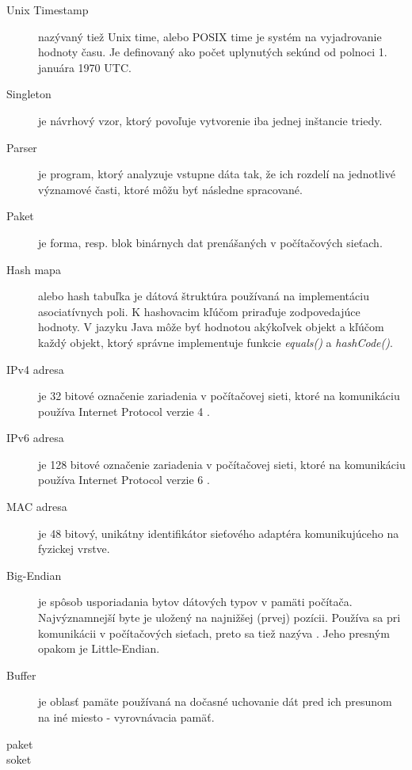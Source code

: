 \documentclass[]{tukediphc}
\begin{document}
\begin{description}
	
	\item[Unix Timestamp] nazývaný tiež Unix time, alebo POSIX time je systém na vyjadrovanie 
	hodnoty času. Je definovaný ako počet uplynutých sekúnd od polnoci 1. januára 1970 UTC.
	
	\item[Singleton] je návrhový vzor, ktorý povoľuje vytvorenie iba jednej inštancie triedy. 
	
	\item[Parser] je program, ktorý analyzuje vstupne dáta tak, že ich rozdelí na jednotlivé 
	významové časti, ktoré môžu byť následne spracované. \citep{veri}
	
	\item[Paket] je forma, resp. blok binárnych dat prenášaných v počítačových sieťach.
	
	\item[Hash mapa] alebo hash tabuľka je dátová štruktúra používaná na implementáciu asociatívnych 
	poli. K hashovacim kľúčom priraďuje zodpovedajúce hodnoty. V jazyku Java môže byť hodnotou 
	akýkoľvek objekt a kľúčom každý objekt, ktorý správne implementuje funkcie \emph{equals()} a 
	\emph{hashCode()}.
	
	\item[IPv4 adresa] je 32 bitové označenie zariadenia v počítačovej sieti, ktoré na komunikáciu 
	používa Internet Protocol verzie 4 \citep{rfc791}.
	
	\item[IPv6 adresa] je 128 bitové označenie zariadenia v počítačovej sieti, ktoré na komunikáciu 
	používa Internet Protocol verzie 6 \citep{rfc2460}.
	
	\item[MAC adresa] je 48 bitový, unikátny identifikátor sieťového adaptéra komunikujúceho na 
	fyzickej vrstve. 
	
	\item[Big-Endian] je spôsob usporiadania bytov dátových typov v pamäti počítača. Najvýznamnejší 
	byte je uložený na najnižšej (prvej) pozícii. Používa sa pri komunikácii v počítačových sieťach,
	preto sa tiež nazýva . Jeho presným opakom je Little-Endian.
	
	\item[Buffer] je oblasť pamäte používaná na dočasné uchovanie dát pred ich presunom na iné 
	miesto - vyrovnávacia pamäť.
	
	\item[paket]
	\item[soket]
	
\end{description}
\end{document}
